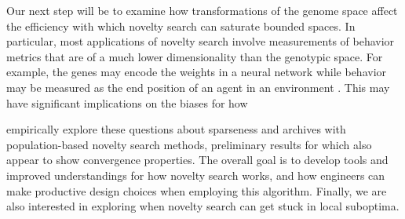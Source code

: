 \documentclass[twoside]{article}
\begin{document}
Our next step will be to examine how transformations of the genome space affect the efficiency with which novelty search can saturate bounded spaces.  In particular, most applications of novelty search involve measurements of behavior metrics that are of a much lower dimensionality than the genotypic space.  For example, the genes may encode the weights in a neural network while behavior may be measured as the end position of an agent in an environment \citep{??}.  This may have significant implications on the biases for how 

empirically explore these questions about sparseness and archives with population-based novelty search methods, preliminary results for which also appear to show convergence properties.  
The overall goal is to develop tools and improved understandings for how novelty search works, and how engineers can make productive design choices when employing this algorithm.  Finally, we are also interested in exploring when novelty search can get stuck in local suboptima.

\small



\end{document}
